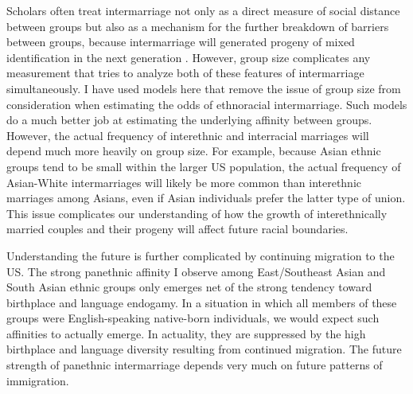 \documentclass[11pt,]{article}
\begin{document}
Scholars often treat intermarriage not only as a direct measure of social distance between groups but also as a mechanism for the further breakdown of barriers between groups, because intermarriage will generated progeny of mixed identification in the next generation \citep{gordon_assimilation_1964}. However, group size complicates any measurement that tries to analyze both of these features of intermarriage simultaneously. I have used models here that remove the issue of group size from consideration when estimating the odds of ethnoracial intermarriage. Such models do a much better job at estimating the underlying affinity between groups. However, the actual frequency of interethnic and interracial marriages will depend much more heavily on group size. For example, because Asian ethnic groups tend to be small within the larger US population, the actual frequency of Asian-White intermarriages will likely be more common than interethnic marriages among Asians, even if Asian individuals prefer the latter type of union. This issue complicates our understanding of how the growth of interethnically married couples and their progeny will affect future racial boundaries.

Understanding the future is further complicated by continuing migration to the US. The strong panethnic affinity I observe among East/Southeast Asian and South Asian ethnic groups only emerges net of the strong tendency toward birthplace and language endogamy. In a situation in which all members of these groups were English-speaking native-born individuals, we would expect such affinities to actually emerge. In actuality, they are suppressed by the high birthplace and language diversity resulting from continued migration. The future strength of panethnic intermarriage depends very much on future patterns of immigration.



\renewcommand\refname{References}

\end{document}
